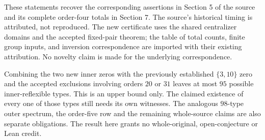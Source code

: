 \documentclass[11pt]{article}
\begin{document}
These statements recover the corresponding assertions in Section 5
of the source and its complete order-four totals in Section 7.
The source's historical timing is attributed, not reproduced. The
new certificate uses the shared centralizer domains and the accepted
fixed-pair theorem; the table of total counts, finite group inputs,
and inversion correspondence are imported with their existing
attribution. No novelty claim is made for the underlying correspondence.

Combining the two new inner zeros with the previously established
$\{3,10\}$ zero and the accepted exclusions involving orders $20$ or
$31$ leaves at most $95$ possible inner-reflexible types. This is an
upper bound only. The claimed existence of every one of those types
still needs its own witnesses. The analogous $98$-type outer spectrum,
the order-five row and the remaining whole-source claims are also
separate obligations. The result here grants no whole-original,
open-conjecture or Lean credit.
\end{document}
